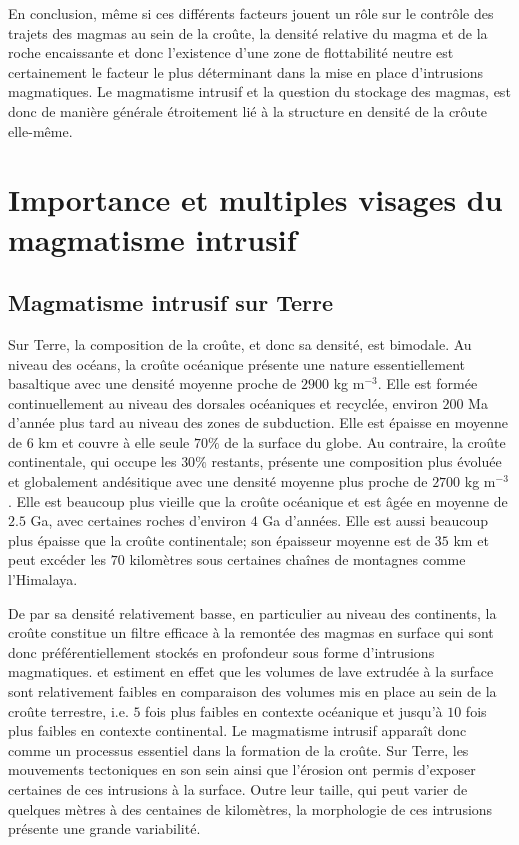 En conclusion, même  si ces différents facteurs jouent un  rôle sur le
contrôle  des trajets  des magmas  au sein  de la  croûte, la  densité
relative du magma et de la roche encaissante et donc l'existence d'une
zone  de  flottabilité neutre  est  certainement  le facteur  le  plus
déterminant  dans  la  mise  en place  d'intrusions  magmatiques.   Le
magmatisme intrusif et la question du stockage des magmas, est donc de
manière  générale étroitement  lié à  la  structure en  densité de  la
crôute elle-même.


\section{Importance et multiples visages du magmatisme intrusif}
\label{C1-sec:zool-des-intr}

\subsection{Magmatisme intrusif sur Terre}
\label{C1-sec:definition}

Sur  Terre, la  composition  de la  croûte, et  donc  sa densité,  est
bimodale.   Au niveau  des océans,  la croûte  océanique présente  une
nature essentiellement  basaltique avec une densité  moyenne proche de
$2900$ kg  m$^{-3}$.  Elle  est formée  continuellement au  niveau des
dorsales océaniques et recyclée, environ $200$ Ma d'année plus tard au
niveau des zones de subduction. Elle  est épaisse en moyenne de $6$ km
et couvre à elle seule $70\%$ de la surface du globe. Au contraire, la
croûte  continentale, qui  occupe  les $30\%$  restants, présente  une
composition plus  évoluée et globalement andésitique  avec une densité
moyenne plus  proche de  $2700$ kg m$^{-3}$.   Elle est  beaucoup plus
vieille que  la croûte océanique et  est âgée en moyenne  de $2.5$ Ga,
avec  certaines  roches d'environ  $4$  Ga  d'années. Elle  est  aussi
beaucoup  plus  épaisse  que  la croûte  continentale;  son  épaisseur
moyenne  est de  $35$  km et  peut excéder  les  $70$ kilomètres  sous
certaines chaînes de montagnes comme l'Himalaya.

De par  sa densité  relativement basse, en  particulier au  niveau des
continents, la croûte  constitue un filtre efficace à  la remontée des
magmas  en  surface  qui   sont  donc  préférentiellement  stockés  en
profondeur sous forme  d'intrusions magmatiques.  \citet{Crisp:1984dm}
et  \citet{White:2006gr} estiment  en effet  que les  volumes de  lave
extrudée à  la surface  sont relativement  faibles en  comparaison des
volumes mis  en place au sein  de la croûte terrestre,  i.e.  $5$ fois
plus faibles en  contexte océanique et jusqu'à $10$  fois plus faibles
en contexte  continental.  Le magmatisme intrusif  apparaît donc comme
un processus essentiel dans la formation de la croûte.  Sur Terre, les
mouvements  tectoniques en  son sein  ainsi que  l'érosion ont  permis
d'exposer  certaines  de ces  intrusions  à  la surface.   Outre  leur
taille,  qui  peut  varier  de  quelques mètres  à  des  centaines  de
kilomètres,  la  morphologie de  ces  intrusions  présente une  grande
variabilité.

